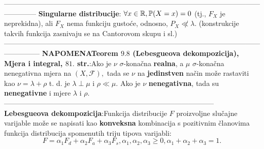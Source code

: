 \documentclass{article}
\begin{document}
--------------------------------------------------------------------------------------------------------------------------\newline\newline
\textbf{Singularne distribucije}: \(\forall x\in\Bbb R,\Bbb P(X=x)=0\) (tj., \(F_X\) je neprekidna), ali \(F_X\) nema funkciju gustoće, odnosno, \(\boxed{P_X\not\ll\lambda}.\) (konstrukcije takvih funkcija zasnivaju se na Cantorovom skupu i sl.)\newline\newline
---------------------------------------------------------------------------------------------------------------------------\newline\newline
{}\textbf{NAPOMENA}\newline \textbf{Teorem \(9.8\) (Lebesgueova dekompozicija), Mjera i integral, \(81.\) str.}:\newline Ako je \(\nu\) \(\sigma\)-konačna \textbf{realna}, a \(\mu\) \(\sigma\)-konačna nenegativna mjera na \((X,\mathcal F),\) tada se \(\nu\) na \textbf{jedinstven} način može rastaviti kao \(\nu=\lambda+\rho\) t. d. je \(\lambda\perp\mu\) i \(\rho\ll\mu.\) Ako je \(\nu\) \textbf{nenegativna}, tada su \textbf{nenegativne} i mjere \(\lambda\) i \(\rho.\)\newline\newline-----------------------------------------------------------------------------------------\newline\newline
\textbf{Lebesgueova dekompozicija}:\newline Funkcija distribucije \(F\) proizvoljne slučajne varijable može se napisati kao \textbf{konveksna} kombinacija s pozitivnim članovima funkcija distribucija spomenutih triju tipova varijabli: \[F=\alpha_1F_d+\alpha_2F_a+\alpha_3F_s,\alpha_1,\alpha_2,\alpha_3\ge 0,\alpha_1+\alpha_2+\alpha_3=1.\]
\newpage
\end{document}
